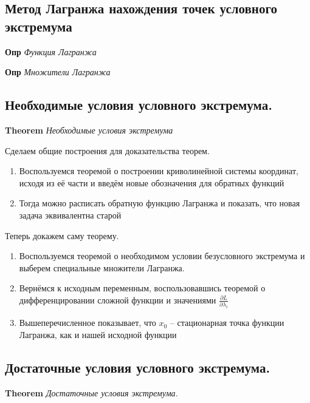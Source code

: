 \documentclass[a4paper, 14pt]{article}
\begin{document}
    \subsection{Метод Лагранжа нахождения точек условного экстремума}
    
    \textbf{Опр} \textit{Функция Лагранжа}
    
    \textbf{Опр} \textit{Множители Лагранжа}
    
    \subsection{Необходимые условия условного экстремума.}
    
    \textbf{Theorem} \textit{Необходимые условия экстремума}
    
    Сделаем общие построения для доказательства теорем.
    
    \begin{enumerate}
        \item Воспользуемся теоремой о построении криволинейной системы координат, исходя из её части и введём новые
        обозначения для обратных функций
        \item Тогда можно расписать обратную функцию Лагранжа и показать, что новая задача эквивалентна старой
    \end{enumerate}
    
    Теперь докажем саму теорему.
    
    \begin{enumerate}
        \item Воспользуемся теоремой о необходимом условии безусловного экстремума и выберем специальные множители
        Лагранжа.
        \item Вернёмся к исходным переменным, воспользовавшись теоремой о дифференцировании сложной функции и значениями
        $\frac{\partial L}{\partial \lambda_i}$
        \item Вышеперечисленное показывает, что $x_0$ -- стационарная точка функции Лагранжа, как и нашей исходной функции
    \end{enumerate}
    
    \subsection{Достаточные условия условного экстремума.}
    
    \textbf{Theorem} \textit{Достаточные условия экстремума.}
    
\end{document}
